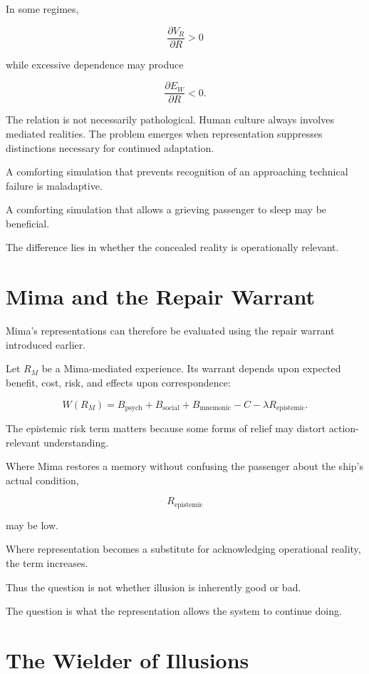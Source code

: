 \documentclass[11pt,oneside]{book}
\theoremstyle{definition}
\theoremstyle{remark}
\begin{document}
In some regimes,

\[
\frac{\partial V_R}{\partial R}>0
\]

while excessive dependence may produce

\[
\frac{\partial E_W}{\partial R}<0.
\]

The relation is not necessarily pathological. Human culture always involves mediated realities. The problem emerges when representation suppresses distinctions necessary for continued adaptation.

A comforting simulation that prevents recognition of an approaching technical failure is maladaptive.

A comforting simulation that allows a grieving passenger to sleep may be beneficial.

The difference lies in whether the concealed reality is operationally relevant.

\section{Mima and the Repair Warrant}

Mima's representations can therefore be evaluated using the repair warrant introduced earlier.

Let \(R_M\) be a Mima-mediated experience. Its warrant depends upon expected benefit, cost, risk, and effects upon correspondence:

\[
W(R_M)
=
B_{\mathrm{psych}}
+
B_{\mathrm{social}}
+
B_{\mathrm{mnemonic}}
-
C
-
\lambda R_{\mathrm{epistemic}}.
\]

The epistemic risk term matters because some forms of relief may distort action-relevant understanding.

Where Mima restores a memory without confusing the passenger about the ship's actual condition,

\[
R_{\mathrm{epistemic}}
\]

may be low.

Where representation becomes a substitute for acknowledging operational reality, the term increases.

Thus the question is not whether illusion is inherently good or bad.

The question is what the representation allows the system to continue doing.

\section{The Wielder of Illusions}
\end{document}
